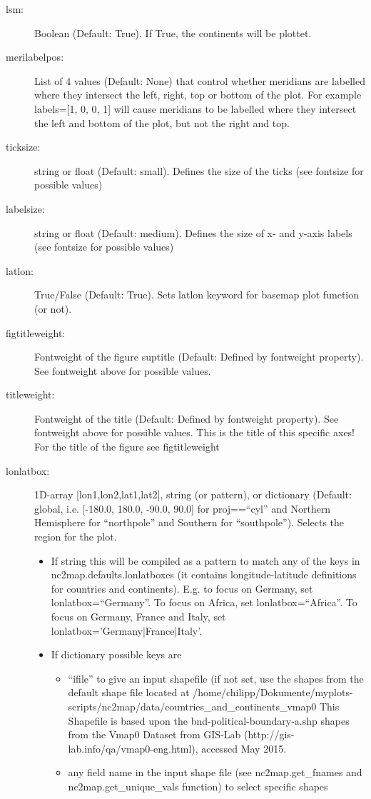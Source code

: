 \begin{description}
    \item[\gls*{lsm}:] \label{item:lsm}  Boolean (Default: True). If True, the continents will be plottet.
    \item[\gls*{merilabelpos}:] \label{item:merilabelpos}  List of 4 values (Default: None) that control whether meridians are labelled where they intersect the left, right, top or bottom of the plot. For example labels=[1, 0, 0, 1] will cause meridians to be labelled where they intersect the left and bottom of the plot, but not the right and top.
    \item[\gls*{ticksize}:] \label{item:ticksize}  string or float (Default: small). Defines the size of the ticks (see fontsize for possible values)
    \item[\gls*{labelsize}:] \label{item:labelsize}  string or float (Default: medium). Defines the size of x- and y-axis labels (see fontsize for possible values)
    \item[\gls*{latlon}:] \label{item:latlon}  True/False (Default: True). Sets latlon keyword for basemap plot function (or not).
    \item[\gls*{figtitleweight}:] \label{item:figtitleweight}  Fontweight of the figure suptitle (Default: Defined by fontweight property). See fontweight above for possible values.
    \item[\gls*{titleweight}:] \label{item:titleweight}  Fontweight of the title (Default: Defined by fontweight property). See fontweight above for possible values. This is the title of this specific axes! For the title of the figure see figtitleweight
    \item[\gls*{lonlatbox}:] \label{item:lonlatbox}  1D-array [lon1,lon2,lat1,lat2], string (or pattern), or dictionary (Default: global, i.e. [-180.0, 180.0, -90.0, 90.0] for proj==\enquote{cyl} and Northern Hemisphere for \enquote{northpole} and Southern for \enquote{southpole}). Selects the region for the plot.
\begin{itemize}
    \item If string this will be compiled as a pattern to match any of the keys in nc2map.defaults.lonlatboxes (it contains longitude-latitude definitions for countries and continents). E.g. to focus on Germany, set lonlatbox=\enquote{Germany}. To focus on Africa, set lonlatbox=\enquote{Africa}. To focus on Germany, France and Italy, set lonlatbox='Germany|France|Italy'.
    \item If dictionary possible keys are
\begin{itemize}
        \item \enquote{ifile} to give an input shapefile (if not set, use the shapes from the default shape file located at /home/chilipp/Dokumente/myplots-scripts/nc2map/data/countries\_and\_continents\_vmap0 This Shapefile is based upon the bnd-political-boundary-a.shp shapes from the Vmap0 Dataset from GIS-Lab (http://gis-lab.info/qa/vmap0-eng.html), accessed May 2015.
        \item any field name in the input shape file (see nc2map.get\_fnames and nc2map.get\_unique\_vals function) to select specific shapes
\end{itemize}
\end{itemize}



\end{description}
